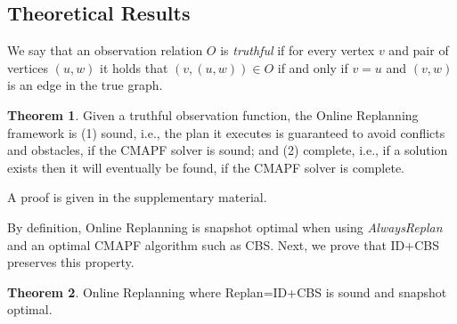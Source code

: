 \documentclass[letterpaper]{article} %
\def\
UrlFont{\rm}  %
\newcommand{\roni}[1]{\textbf{[\color{orange}RONI:#1]}}
\theoremstyle{definition}
\newtheorem{theorem}{Theorem}
\begin{document}

\subsection{Theoretical Results}

We say that an observation relation $O$ is \emph{truthful} if for every vertex $v$ and pair of vertices $(u,w)$ it holds that $(v,(u,w))\in O$ if and only if $v=u$ and $(v,w)$ is an edge in the true graph.
\begin{theorem}
Given a truthful observation function,
the Online Replanning framework is (1) sound, i.e., the plan it executes is guaranteed to avoid conflicts and obstacles, if the CMAPF solver is sound; and (2) complete, i.e., if a solution exists then it will eventually be found, if the CMAPF solver is complete.
\end{theorem}
\noindent A proof is given in the supplementary material.


By definition, Online Replanning is snapshot optimal when using \emph{AlwaysReplan} and an optimal CMAPF algorithm such as CBS.
Next, we prove that ID+CBS preserves this property.
\begin{theorem}
   Online Replanning where Replan=ID+CBS is sound and snapshot optimal.
\end{theorem}
\end{document}

